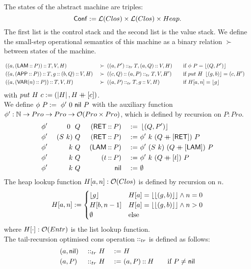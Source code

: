 The states of the abstract machine are triples:
\[
  \mathsf{Conf} := \mathcal{L}(Clos) \times \mathcal{L}(Clos) \times Heap.
\]
The first list is the control stack and the second list is the value stack.  We define the small-step operational semantics of this machine as a
binary relation $\succ$ between states of the machine.
\begin{definition}
  {\small
    \begin{alignat*}{4}
      & \left((a, (\mathsf{LAM} \mathbin{::} P)) \mathbin{::} T, V, H\right)                      &~\succ~& \left((a, P') \mathbin{::}_{tr} T, (a,Q) \mathbin{::} V, H\right)
      \quad&& \text{if $\phi~P = \left\lfloor {(Q, P')} \right\rfloor$} & \\
      & \left((a, (\mathsf{APP} \mathbin{::} P)) \mathbin{::} T, g \mathbin{::} (b, Q) \mathbin{::} V, H\right) &~\succ~& \left((c, Q) \mathbin{::} (a,P) \mathbin{::}_{tr} T, V, H'\right)
      \quad&& \text{if $put~H~\left\lfloor {(g,b)} \right\rfloor = (c,H')$} \\
      & \left((a, (\mathsf{VAR}(n) \mathbin{::} P)) \mathbin{::} T, V, H\right)                   &~\succ~& \left((a, P) \mathbin{::}_{tr} T, g \mathbin{::} V, H\right)
      \quad&& \text{if $H[a,n]=\left\lfloor {g} \right\rfloor$} &
    \end{alignat*}
  }
  with $put~H~c := (\left| H \right|, H \mathbin{+\mkern-10mu+} [c]) $.\\
  We define $\phi~P :=~ \phi'~0~\mathsf{nil}~P$ with the auxiliary function $\phi' : \mathbb{N} \rightarrow Pro \rightarrow Pro \rightarrow \mathcal{O}(Pro \times Pro)$, which is defined by
  recursion on $P:Pro$.
  \begin{alignat*}{4}
    &\phi'&~0~   &~Q&~(\mathsf{RET} \mathbin{::} P) &&~:=~& \left\lfloor {(Q,P')} \right\rfloor \\
    &\phi'&~(S~k)&~Q&~(\mathsf{RET} \mathbin{::} P) &&~:=~& \phi'~k~(Q \mathbin{+\mkern-10mu+} [\mathsf{RET}])~P \\
    &\phi'&~k    &~Q&~(\mathsf{LAM} \mathbin{::} P) &&~:=~& \phi'~(S~k)~(Q \mathbin{+\mkern-10mu+} [\mathsf{LAM}])~P \\
    &\phi'&~k    &~Q&~(t        \mathbin{::} P) &&~:=~& \phi'~k~(Q \mathbin{+\mkern-10mu+} [t])~P \\
    &\phi'&~k    &~Q&~              \mathsf{nil} &&~:=~& \emptyset \\
  \end{alignat*}
  The heap lookup function $H[a,n] : \mathcal{O}(Clos)$ is defined by recursion on $n$.
  \[
    H[a,n] :=
    \begin{cases}
      \left\lfloor {g} \right\rfloor  & H[a]=\left\lfloor {\left\lfloor {(g,b)} \right\rfloor} \right\rfloor \land n=0 \\
      H[b, n-1] & H[a]=\left\lfloor {\left\lfloor {(g,b)} \right\rfloor} \right\rfloor \land n>0 \\
      \emptyset     & \text{else}
    \end{cases}
  \]
  where $H[\cdot] : \mathcal{O}(Entr)$ is the list lookup function. \\
  The tail-recursion optimised cons operation $\mathbin{::}_{tr}$ is defined as follows:
  \begin{alignat*}{3}
    & (a, \mathsf{nil}) &~\mathbin{::}_{tr}~& H &~:=~& H \\
    & (a, P   ) &~\mathbin{::}_{tr}~& H &~:=~& (a, P) \mathbin{::} H \qquad\text{if $P \neq \mathsf{nil}$}
  \end{alignat*}
\end{definition}

